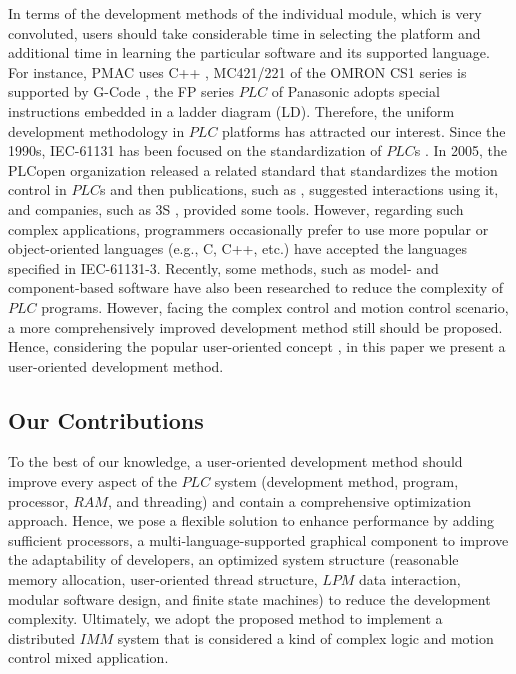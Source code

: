 \documentclass[journal,UTF8]{IEEEtran}
\begin{document}
	In terms of the development methods of the individual module, which is very convoluted, users should take considerable time in selecting the platform and additional time in learning the particular software and its supported language. For instance,  PMAC uses C++ \cite{Peng2011Linear,Qian2014A}, MC421/221 of the OMRON CS1 series is supported by G-Code \cite{OMRON2006CS1W}, the FP series $PLC$ of Panasonic adopts special instructions embedded in  a ladder diagram (LD). Therefore, the uniform development methodology in $PLC$ platforms has attracted our interest. Since the 1990s, IEC-61131 has been focused on the standardization of $PLC$s \cite{IEC1993Programmable}. In 2005, the PLCopen organization released a related standard \cite{PLCopen2005Function} that standardizes the motion control in $PLC$s and then publications, such as \cite{S2006Advanced}, suggested interactions using it, and companies, such as 3S \cite{3S2017Logic}, provided some tools. However, regarding such complex applications, programmers occasionally prefer to use more popular or object-oriented languages (e.g., C, C++, etc.) \cite{Bonfe2001Object, Werner2009Object, Basile2013On} have accepted the languages specified in IEC-61131-3. Recently, some methods, such as model- and component-based software \cite{Bonf2013Design, Vyatkin2013Software} have also been researched to reduce the complexity of $PLC$ programs. However, facing the complex control and motion control scenario, a more comprehensively improved development method still should be proposed. Hence, considering the popular user-oriented concept \cite{Verscheure2016User, Choi2017A}, in this paper we present a user-oriented development method.
	
	\subsection{Our Contributions}
	To the best of our knowledge, a user-oriented development method should improve every aspect of the $PLC$ system (development method, program, processor, $RAM$, and threading) and contain a comprehensive optimization approach. Hence, we pose a flexible solution to enhance performance by adding sufficient processors, a multi-language-supported graphical component to improve the adaptability of developers, an optimized system structure (reasonable memory allocation, user-oriented thread structure, $LPM$ data interaction, modular software design, and finite state machines) to reduce the development complexity. Ultimately, we adopt the proposed method to implement a distributed $IMM$ system that is considered a kind of complex logic and motion control mixed application.
	
\end{document}

